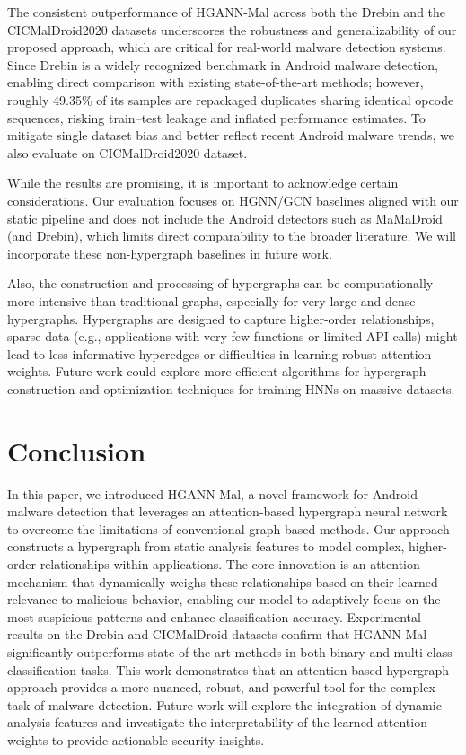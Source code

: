 \documentclass[runningheads]{llncs}
\begin{document}
The consistent outperformance of HGANN-Mal across both the Drebin and the CICMalDroid2020 datasets underscores the robustness and generalizability of our proposed approach, which are critical for real-world malware detection systems. Since Drebin is a widely recognized benchmark in Android malware detection, enabling direct comparison with existing state-of-the-art methods; however, roughly 49.35\% of its samples are repackaged duplicates sharing identical opcode sequences, risking train–test leakage and inflated performance estimates. To mitigate single dataset bias and better reflect recent Android malware trends, we also evaluate on CICMalDroid2020 dataset.



While the results are promising, it is important to acknowledge certain considerations. 
Our evaluation focuses on HGNN/GCN baselines aligned with our static pipeline and does not include the Android detectors such as MaMaDroid \cite{mamadroid} (and Drebin), which limits direct comparability to the broader literature. We will incorporate these non-hypergraph baselines in future work.

Also, the construction and processing of hypergraphs can be computationally more intensive than traditional graphs, especially for very large and dense hypergraphs. Hypergraphs are designed to capture higher-order relationships, sparse data (e.g., applications with very few functions or limited API calls) might lead to less informative hyperedges or difficulties in learning robust attention weights.
Future work could explore more efficient algorithms for hypergraph construction and optimization techniques for training HNNs on massive datasets.


\section{Conclusion}
In this paper, we introduced HGANN-Mal, a novel framework for Android malware detection that leverages an attention-based hypergraph neural network to overcome the limitations of conventional graph-based methods. Our approach constructs a hypergraph from static analysis features to model complex, higher-order relationships within applications. The core innovation is an attention mechanism that dynamically weighs these relationships based on their learned relevance to malicious behavior, enabling our model to adaptively focus on the most suspicious patterns and enhance classification accuracy. Experimental results on the Drebin and CICMalDroid datasets confirm that HGANN-Mal significantly outperforms state-of-the-art methods in both binary and multi-class classification tasks. This work demonstrates that an attention-based hypergraph approach provides a more nuanced, robust, and powerful tool for the complex task of malware detection. Future work will explore the integration of dynamic analysis features and investigate the interpretability of the learned attention weights to provide actionable security insights.
\end{document}
